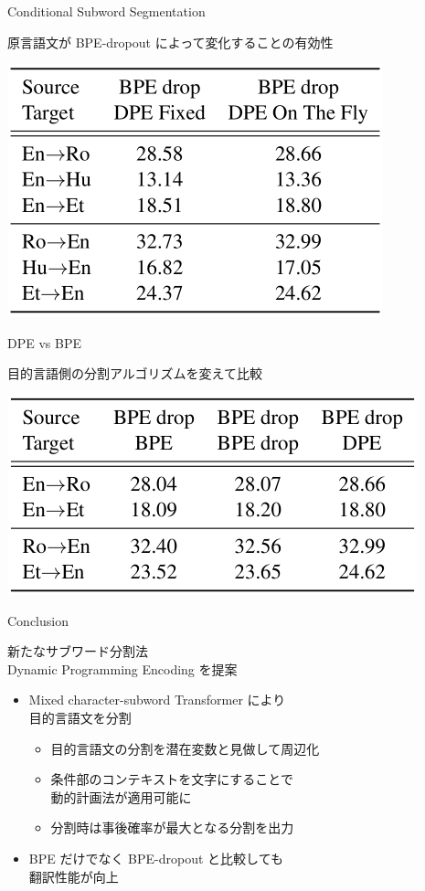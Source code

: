 \documentclass[unicode, 12pt, xdvipdfmx, aspectratio=43]{beamer}
\begin{document}
\begin{frame}[label={sec:orgcaf11ad}]{Conditional Subword Segmentation}
\begin{block}{\small 原言語文が BPE-dropout によって変化することの有効性}
\begin{center}
\includegraphics[width=0.6\linewidth]{./figure/Table6.pdf}
\end{center}
\end{block}
\end{frame}

\begin{frame}[label={sec:org98c0f27}]{DPE vs BPE}
\begin{block}{目的言語側の分割アルゴリズムを変えて比較}
\begin{center}
\includegraphics[width=0.6\linewidth]{./figure/Table7.pdf}
\end{center}
\end{block}
\end{frame}

\begin{frame}[label={sec:org1cef520}]{Conclusion}
\begin{block}{新たなサブワード分割法 \\ Dynamic Programming Encoding を提案}
\begin{itemize}
\item \alert{Mixed character-subword Transformer} により \\ 目的言語文を分割
\begin{itemize}
\item 目的言語文の分割を潜在変数と見做して周辺化
\item 条件部のコンテキストを文字にすることで \\ 動的計画法が適用可能に
\item 分割時は事後確率が最大となる分割を出力
\end{itemize}
\end{itemize}
\begin{itemize}
\item BPE だけでなく BPE-dropout と比較しても \\ 翻訳性能が向上
\end{itemize}
\end{block}
\end{frame}
\end{document}
